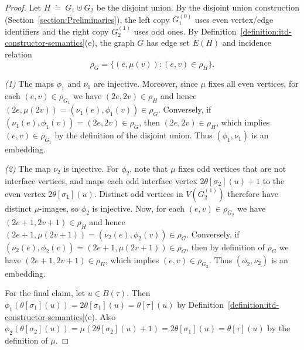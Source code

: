 \documentclass[11pt,a4paper]{article}
\newcommand{\vertexset}[1]{V(#1)}
\newcommand{\edgeset}[1]{E(#1)}
\newcommand{\incidencerelationname}{\rho}
\newcommand{\incidencerelation}[1]{\incidencerelationname_{#1}}
\newcommand{\topbagname}{B}
\newcommand{\topbag}[1]{\topbagname(#1)}
\newcommand{\abstractdecomposition}{\tau}
\newcommand{\sigmaabstractdecomposition}{\sigma}
\newcommand{\defeq}{~\dot{=}~}
\newcommand{\topmapname}{\theta}
\newcommand{\topmap}[1]{\topmapname[#1]}
\begin{document}
\begin{proof}
Let $H\defeq G_1\uplus G_2$ be the disjoint union. By the disjoint union construction (Section~\ref{section:Preliminaries}), the left copy $G_1^{(0)}$ uses even vertex/edge identifiers and the right copy $G_2^{(1)}$ uses odd ones. By Definition~\ref{definition:itd-constructor-semantics}(e), the graph $G$ has edge set $\edgeset{H}$ and incidence relation
\[
\incidencerelation{G}=\{(e,\mu(v)):(e,v)\in \incidencerelation{H}\}.
\]

\emph{(1)} The maps $\phi_1$ and $\nu_1$ are injective. Moreover, since $\mu$ fixes all even vertices, for each $(e,v)\in \incidencerelation{G_1}$ we have $(2e,2v)\in \incidencerelation{H}$ and hence $(2e,\mu(2v))=(\nu_1(e),\phi_1(v))\in \incidencerelation{G}$. Conversely, if $(\nu_1(e),\phi_1(v))=(2e,2v)\in \incidencerelation{G}$, then $(2e,2v)\in \incidencerelation{H}$, which implies $(e,v)\in \incidencerelation{G_1}$ by the definition of the disjoint union. Thus $(\phi_1,\nu_1)$ is an embedding.

\emph{(2)} The map $\nu_2$ is injective. For $\phi_2$, note that $\mu$ fixes odd vertices that are not interface vertices, and maps each odd interface vertex $2\topmap{\sigmaabstractdecomposition_2}(u)+1$ to the even vertex $2\topmap{\sigmaabstractdecomposition_1}(u)$. Distinct odd vertices in $\vertexset{G_2^{(1)}}$ therefore have distinct $\mu$-images, so $\phi_2$ is injective. Now, for each $(e,v)\in \incidencerelation{G_2}$ we have $(2e+1,2v+1)\in \incidencerelation{H}$ and hence $(2e+1,\mu(2v+1))=(\nu_2(e),\phi_2(v))\in \incidencerelation{G}$. Conversely, if $(\nu_2(e),\phi_2(v))=(2e+1,\mu(2v+1))\in \incidencerelation{G}$, then by definition of $\incidencerelation{G}$ we have $(2e+1,2v+1)\in \incidencerelation{H}$, which implies $(e,v)\in \incidencerelation{G_2}$. Thus $(\phi_2,\nu_2)$ is an embedding.

For the final claim, let $u\in \topbag{\abstractdecomposition}$. Then $\phi_1(\topmap{\sigmaabstractdecomposition_1}(u))=2\topmap{\sigmaabstractdecomposition_1}(u)=\topmap{\abstractdecomposition}(u)$ by Definition~\ref{definition:itd-constructor-semantics}(e). Also $\phi_2(\topmap{\sigmaabstractdecomposition_2}(u))=\mu(2\topmap{\sigmaabstractdecomposition_2}(u)+1)=2\topmap{\sigmaabstractdecomposition_1}(u)=\topmap{\abstractdecomposition}(u)$ by the definition of $\mu$.
\end{proof}
\end{document}
